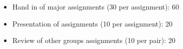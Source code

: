 \begin{itemize}
	\item Hand in of major assignments (30 per assignment): 60
	\item Presentation of assignments (10 per assignment): 20
	\item Review of other groups assignments (10 per pair): 20
\end{itemize}
